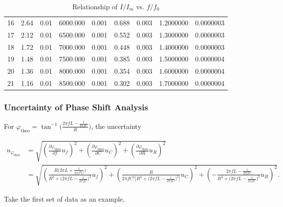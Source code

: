 \documentclass[a4paper]{article}
\begin{document}
\begin{table}[htbp]
\begin{tabular}{ccccccccc}
		16 & 2.64        & 0.01            & 6000.000 & 0.001      & 0.688   & 0.003       & 1.2000000 & 0.0000003   \\
		17 & 2.12        & 0.01            & 6500.000 & 0.001      & 0.552   & 0.003       & 1.3000000 & 0.0000003   \\
		18 & 1.72        & 0.01            & 7000.000 & 0.001      & 0.448   & 0.003       & 1.4000000 & 0.0000003   \\
		19 & 1.48        & 0.01            & 7500.000 & 0.001      & 0.385   & 0.003       & 1.5000000 & 0.0000004   \\
		20 & 1.36        & 0.01            & 8000.000 & 0.001      & 0.354   & 0.003       & 1.6000000 & 0.0000004   \\
		21 & 1.16        & 0.01            & 8500.000 & 0.001      & 0.302   & 0.003       & 1.7000000 & 0.0000004   \\
		\hline
	\end{tabular}
	\caption{Relationship of $I/I_m$ vs. $f/f_0$}
	\label{table::frequency}
\end{table}

\subsubsection{Uncertainty of Phase Shift Analysis}

For $\varphi_\text{theo} = \tan^{-1}\bigg(\frac{2\pi fL-\frac{1}{2\pi fC}}{R}\bigg)$, the uncertainty

\begin{align*}
	u_{\varphi_\text{theo}} & = \sqrt{(\frac{\partial \varphi_\text{theo}}{\partial f}u_f)^2 + (\frac{\partial \varphi_\text{theo}}{\partial C}u_C)^2 + (\frac{\partial \varphi_\text{theo}}{\partial R}u_R)^2}                                                                                                                                               \\
	                        & = \sqrt{\left( \frac{R\big(2\pi L +\frac{1}{2\pi f^2 C}\big)}{R^2 + \big(2\pi fL - \frac{1}{2\pi fC}\big)^2} u_f \right)^2 + \left( \frac{R}{2\pi fC^2\big[R^2+\big(2\pi fL - \frac{1}{2\pi fC}\big)^2\big]} u_C \right)^2 + \left(-\frac{2\pi fL-\frac{1}{2\pi fC}}{R^2+\big(2\pi fL-\frac{1}{2\pi fC}\big)^2} u_R \right)^2}.
\end{align*}

Take the first set of data as an example,
\end{document}
